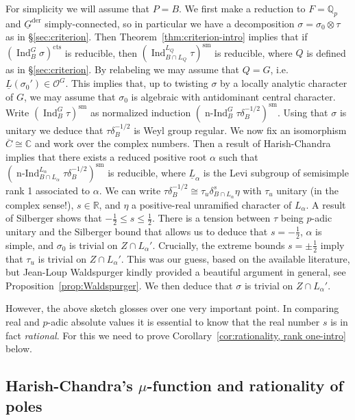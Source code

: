\documentclass[a4paper]{amsart}
\numberwithin{equation}{section}
\theoremstyle{remark}
\theoremstyle{definition}
\DeclareMathOperator{\Ind}{Ind}
\DeclareMathOperator{\nInd}{n-Ind}
\newcommand{\C}{\mathbb{C}}
\newcommand{\Q}{\mathbb{Q}}
\newcommand{\R}{\mathbb{R}}
\newcommand{\sm}{\mathrm{sm}}
\newcommand{\alggrp}[1]{\underline{#1}}
\newcommand{\der}{\mathrm{der}}
\newcommand{\cts}{\mathrm{cts}}
\begin{document}
For simplicity we will assume that $P = B$.
We first make a reduction to $F = \Q_p$ and $\alggrp G^\der$ simply-connected, so in particular we have a decomposition $\sigma = \sigma_0 \otimes \tau$ as in \S\ref{sec:criterion}.
Then Theorem~\ref{thm:criterion-intro} implies that if $(\Ind_B^G \sigma)^\cts$ is reducible, then $(\Ind_{B\cap L_Q}^{L_Q} \tau)^\sm$ is reducible, where $Q$ is defined as in \S\ref{sec:criterion}.
By relabeling we may assume that $Q = G$, i.e.\ $\underline L(\sigma_0') \in \mathcal O^G$.
This implies that, up to twisting $\sigma$ by a locally analytic character of $G$, we may assume that $\sigma_0$ is algebraic with antidominant central character.
Write $(\Ind_{B}^{G} \tau)^\sm$ as normalized induction $(\nInd_{B}^{G} \tau\delta_B^{-1/2})^\sm$.
Using that $\sigma$ is unitary we deduce that $\tau\delta_B^{-1/2}$ is Weyl group regular.
We now fix an isomorphism $\overline C \cong \C$ and work over the complex numbers.
Then a result of Harish-Chandra implies that there exists a reduced positive root $\alpha$ such that $(\nInd_{B \cap L_\alpha}^{L_\alpha} \tau\delta_B^{-1/2})^\sm$ is reducible, where $\alggrp L_\alpha$ is the Levi subgroup of semisimple rank 1 associated to $\alpha$.
We can write $\tau\delta_B^{-1/2} \cong \tau_u \delta_{B \cap L_\alpha}^s \eta$ with $\tau_u$ unitary (in the complex sense!), $s \in \R$, and $\eta$ a positive-real unramified character of $L_\alpha$.
A result of Silberger shows that $-\frac 12 \le s \le \frac 12$.
There is a tension between $\tau$ being $p$-adic unitary and the Silberger bound that allows us to deduce that $s = -\frac 12$, $\alpha$ is simple, and $\sigma_0$ is trivial on $Z \cap L_\alpha'$.
Crucially, the extreme bounds $s = \pm \frac{1}{2}$
imply that $\tau_u$ is trivial on $Z\cap L_\alpha'$.
This was our guess, based on the available literature, but Jean-Loup Waldspurger kindly provided a beautiful argument in general, see Proposition~\ref{prop:Waldspurger}.
We then deduce that $\sigma$ is trivial on $Z\cap L_\alpha'$.

However, the above sketch glosses over one very important point.
In comparing real and $p$-adic absolute values it is essential to know that the real number $s$ is in fact \emph{rational}.
For this we need to prove Corollary~\ref{cor:rationality, rank one-intro} below.

\subsection{Harish-Chandra's \texorpdfstring{$\mu$}{mu}-function and rationality of poles}
\label{sec:harish-chandra-mu}
\end{document}
